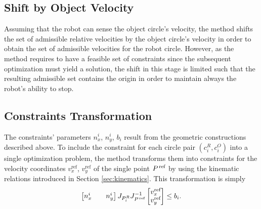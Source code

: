 \documentclass{article}
\begin{document}
\subsection{Shift by Object Velocity}\label{sec:svo}

Assuming that the robot can sense the object circle's velocity, the method shifts the set of admissible relative velocities by the object circle's velocity in order to obtain the set of admissible velocities for the robot circle. However, as the method requires to have a feasible set of constraints since the subsequent optimization must yield a solution, the shift in this stage is limited such that the resulting admissible set contains the origin in order to maintain always the robot's ability to stop.

%
%
%

\subsection{Constraints Transformation}\label{sec:tcvo}

The constraints' parameters $ n_x^i$, $ n_y^i $, $ b_i $ result from the geometric constructions described above. To include the constraint for each circle pair $ (c_i^R, c_i^O) $ into a single optimization problem, the method transforms them into constraints for the velocity coordinates $ v_x^\text{ref} $, $ v_y^\text{ref} $ of the single point $ P^\text{\,ref} $ by using the kinematic relations introduced in Section \ref{sec:kinematics}. This transformation is simply
\begin{align}\label{eq:consVref}
\begin{bmatrix}
n_x^i && n_y^i
\end{bmatrix}
J_{P_i^R} J_{P^\text{\,ref}}^{-1}
\begin{bmatrix}
v_x^\text{ref} \\
v_y^\text{ref}
\end{bmatrix} \leq  b_i .
\end{align}
\end{document}
